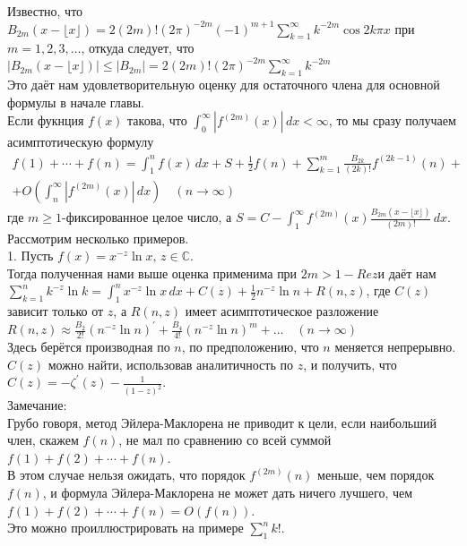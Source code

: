 \documentclass{report}
\begin{document}
Известно, что \\
$B_{2m}(x-\lfloor{x}\rfloor)=2(2m)!(2\pi)^{-2m}(-1)^{m+1}\sum_{k=1}^{\infty}k^{-2m}\cos{2k\pi{x}}$ при $m=1,2,3,\dots$, откуда следует, что \\
$|B_{2m}(x-\lfloor{x}\rfloor)|\le |B_{2m}|=2(2m)!(2\pi)^{-2m}\sum_{k=1}^{\infty}k^{-2m}$ \\
Это даёт нам удовлетворительную оценку для остаточного члена для основной формулы в начале главы. \\
Если фукнция $f(x)$ такова, что $\int_{0}^{\infty}|f^{(2m)}(x)|\,dx<\infty$, то мы сразу получаем асимптотическую формулу \\
\begin{multline}
f(1)+\cdots+f(n)=\int_{1}^{n}f(x)\,dx+S+\frac{1}{2}f(n)+\sum_{k=1}^{m}\frac{B_{2k}}{(2k)!}f^{(2k-1)}(n)+ \\ +O\left(\int_{n}^{\infty}|f^{(2m)}(x)|\,dx\right)\quad(n\to\infty)
\end{multline}
где $m\geq{1}$-фиксированное целое число, а $S=C-\int_{1}^{\infty}f^{(2m)}(x)\frac{B_{2m}(x-\lfloor{x}\rfloor)}{(2m)!}\,dx$.
Рассмотрим несколько примеров. \\
1. Пусть $f(x)=x^{-z}\ln{x},\,z\in\mathbb{C}$. \\
Тогда полученная нами выше оценка применима при $2m>1-Re{z}$и даёт нам \\
$\sum_{k=1}^{n}k^{-z}\ln{k}=\int_{1}^{n}x^{-z}\ln{x}\,dx+C(z)+\frac{1}{2}n^{-z}\ln{n}+R(n,z)$, где $C(z)$ зависит только от $z$, а $R(n,z)$ имеет асимптотическое разложение \\
$R(n,z)\approx\frac{B_2}{2!}(n^{-z}\ln{n})^{\prime}+\frac{B_4}{4!}(n^{-z}\ln{n})^{m}+\dots\quad(n\to\infty)$ \\
Здесь берётся производная по $n$, по предположению, что $n$ меняется непрерывно. \\
$C(z)$ можно найти, использовав аналитичность по $z$, и получить, что $C(z)=-\zeta^{\prime}(z)-\frac{1}{(1-z)^{2}}$.\\
Замечание: \\
Грубо говоря, метод Эйлера-Маклорена не приводит к цели, если наибольший член, скажем $f(n)$, не мал по сравнению со всей суммой $f(1)+f(2)+\cdots+f(n)$. \\
В этом случае нельзя ожидать, что порядок $f^{(2m)}(n)$ меньше, чем порядок $f(n)$, и формула Эйлера-Маклорена не может дать ничего лучшего, чем $f(1)+f(2)+\cdots+f(n)=O(f(n))$. \\
Это можно проиллюстрировать на примере $\sum_{1}^{n}k!$. \\
\end{document}
